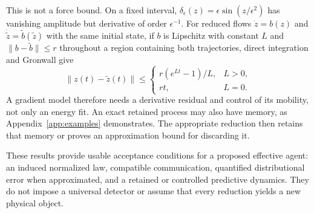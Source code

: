 This is not a force bound. On a fixed interval,
$\delta_\epsilon(z)=\epsilon\sin(z/\epsilon^2)$ has vanishing amplitude but derivative of order $\epsilon^{-1}$. For reduced flows $\dot z=b(z)$ and $\dot{\tilde z}=\tilde b(\tilde z)$ with the same initial state, if $b$ is Lipschitz with constant $L$ and $\|b-\tilde b\|\leq r$ throughout a region containing both trajectories, direct integration and Gronwall give
\begin{equation}
\|z(t)-\tilde z(t)\|\leq
\begin{cases}
r(e^{Lt}-1)/L,&L>0,\\
rt,&L=0.
\end{cases}
\label{eq:rg_force_error}
\end{equation}
A gradient model therefore needs a derivative residual and control of its mobility, not only an energy fit. An exact retained process may also have memory, as Appendix~\ref{app:examples} demonstrates. The appropriate reduction then retains that memory or proves an approximation bound for discarding it.

These results provide usable acceptance conditions for a proposed effective agent: an induced normalized law, compatible communication, quantified distributional error when approximated, and a retained or controlled predictive dynamics. They do not impose a universal detector or assume that every reduction yields a new physical object.
